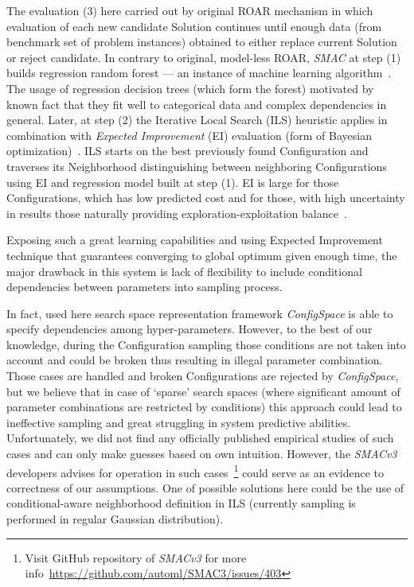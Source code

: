 The evaluation (3) here carried out by original ROAR mechanism in which evaluation of each new candidate Solution continues until enough data (from benchmark set of problem instances) obtained to either replace current Solution or reject candidate. In contrary to original, model-less ROAR, \textit{SMAC} at step (1) builds regression random forest — an instance of machine learning algorithm~\cite{breiman2001random}. The usage of regression decision trees (which form the forest) motivated by known fact that they fit well to categorical data and complex dependencies in general. Later, at step (2) the Iterative Local Search (ILS) heuristic applies in combination with \textit{Expected Improvement} (EI) evaluation (form of Bayesian optimization)~\cite{shahriari2015taking}. ILS starts on the best previously found Configuration and traverses its Neighborhood distinguishing between neighboring Configurations using EI and regression model built at step (1). EI is large for those Configurations, which has low predicted cost and for those, with high uncertainty in results those naturally providing exploration-exploitation balance~\cite{jones1998efficient}.

Exposing such a great learning capabilities and using Expected Improvement technique that guarantees converging to global optimum given enough time, the major drawback in this system is lack of flexibility to include conditional dependencies between parameters into sampling process. 

In fact, used here search space representation framework \textit{ConfigSpace}\cite{configspace} is able to specify dependencies among hyper-parameters. However, to the best of our knowledge, during the Configuration sampling those conditions are not taken into account and could be broken thus resulting in illegal parameter combination. Those cases are handled and broken Configurations are rejected by \textit{ConfigSpace}, but we believe that in case of `sparse' search spaces (where significant amount of parameter combinations are restricted by conditions) this approach could lead to ineffective sampling and great struggling in system predictive abilities. Unfortunately, we did not find any officially published empirical studies of such cases and can only make guesses based on own intuition. However, the \textit{SMACv3} developers advises for operation in such cases~\footnote[1]{Visit GitHub repository of \textit{SMACv3} for more info~\url{https://github.com/automl/SMAC3/issues/403}} could serve as an evidence to correctness of our assumptions. One of possible solutions here could be the use of conditional-aware neighborhood definition in ILS (currently sampling is performed in regular Gaussian distribution). 


